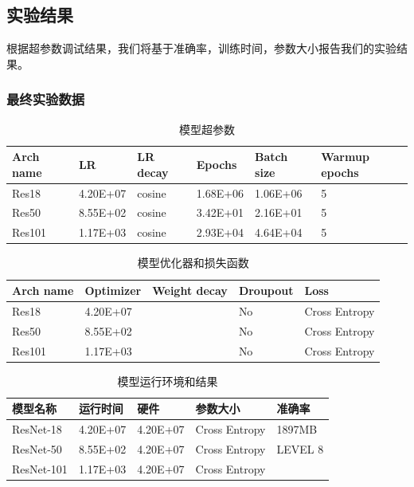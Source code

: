 \documentclass[hyperref, UTF8, 12pt]{article}
\theoremstyle{definition}
\begin{document}
\subsection{实验结果}
根据超参数调试结果，我们将基于准确率，训练时间，参数大小报告我们的实验结果。
\subsubsection{最终实验数据}
\begin{table}[h]
	\centering
	\caption{模型超参数}
	\begin{tabular}{l|l|l|l|l|l}
		\toprule
		Arch name & LR       & LR decay & Epochs   & Batch size & Warmup epochs \\ \midrule
		Res18     & 4.20E+07 & cosine   & 1.68E+06 & 1.06E+06   & 5             \\ \midrule
		Res50     & 8.55E+02 & cosine   & 3.42E+01 & 2.16E+01   & 5              \\ \midrule
		Res101    & 1.17E+03 & cosine   & 2.93E+04 & 4.64E+04   &  5            \\ \bottomrule
	\end{tabular}
\end{table}

\begin{table}[h]
	\centering
	\caption{模型优化器和损失函数}
	\begin{tabular}{l|l|l|l|l}
		\toprule
		Arch name & Optimizer& Weight decay & Droupout   & Loss           \\ \midrule
		Res18     & 4.20E+07 &         	    & No 	     & Cross Entropy  \\ \midrule
		Res50     & 8.55E+02 &              & No         & Cross Entropy  \\ \midrule
		Res101    & 1.17E+03 &              & No         & Cross Entropy  \\ \bottomrule
	\end{tabular}
\end{table}

\begin{table}[h]
	\centering
	\caption{模型运行环境和结果}
	\begin{tabular}{l|l|l|l|l}
		\toprule
		模型名称       & 运行时间      & 硬件         & 参数大小     & 准确率 	 \\ \midrule
		ResNet-18     & 4.20E+07     & 4.20E+07     & Cross Entropy  & 1897MB        \\ \midrule
		ResNet-50     & 8.55E+02     & 4.20E+07     & Cross Entropy  & LEVEL 8       \\ \midrule
		ResNet-101    & 1.17E+03     & 4.20E+07      & Cross Entropy &               \\ \bottomrule
	\end{tabular}
\end{table}
\end{document}
